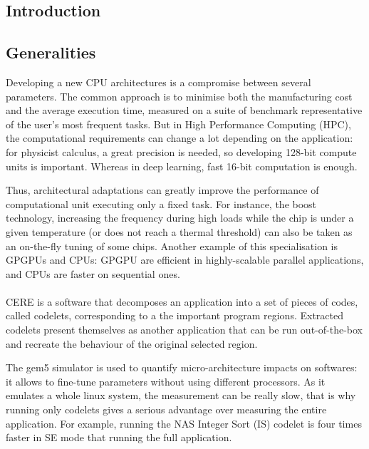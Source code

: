 \documentclass{article}
\begin{document}
\begin{multicols}{2}

\section{Introduction}
\subsection{Generalities}
Developing a new CPU architectures is a compromise between several parameters. The common approach is to minimise both the manufacturing cost and the average execution time, measured on a suite of benchmark representative of the user's most frequent tasks. But in High Performance Computing (HPC), the computational requirements can change a lot depending on the application: for physicist calculus, a great precision is needed, so developing 128-bit compute units is important. Whereas in deep learning, fast 16-bit computation is enough.

Thus, architectural adaptations can greatly improve the performance of computational unit executing only a fixed task.
For instance, the boost technology, increasing the frequency during high loads while the chip is under a given temperature (or does not reach a thermal threshold) can also be taken as an on-the-fly tuning of some chips. Another example of this specialisation is GPGPUs and CPUs: GPGPU are efficient in highly-scalable parallel applications, and CPUs are faster on sequential ones.



\paragraph{}
CERE is a software that decomposes an application into a set of pieces of codes, called codelets, corresponding to a the important program regions. Extracted codelets present themselves as another application that can be run out-of-the-box and recreate the behaviour of the original selected region.


The gem5 simulator\cite{gem5-sim} is used to quantify micro-architecture impacts on softwares: it allows to fine-tune parameters without using different processors. As it emulates a whole linux system, the measurement can be really slow, that is why running only codelets gives a serious advantage over measuring the entire application. For example, running the NAS Integer Sort (IS) codelet is four times faster in SE mode that running the full application.



\end{multicols}
\end{document}
